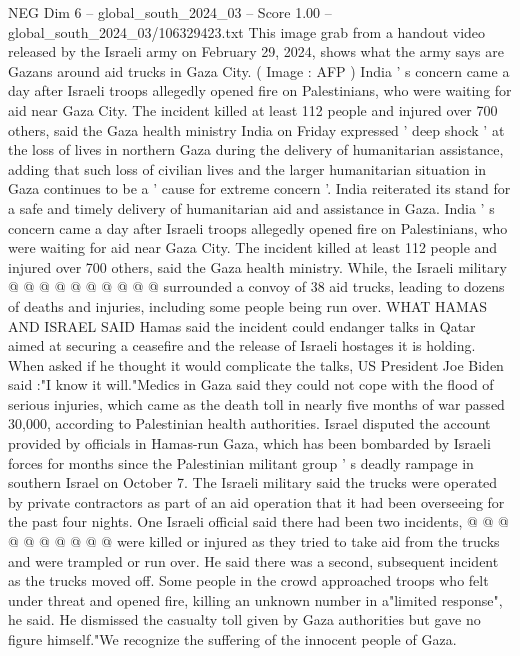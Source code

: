 \begin{textsample}{NEG Dim 6 – global\_south\_2024\_03 – Score 1.00 – global\_south\_2024\_03/106329423.txt}  \label{ex:f6_neg_392}
This image grab from a handout video released by the Israeli army on February 29, 2024, shows what the army says are Gazans around aid trucks in Gaza City. ( Image : AFP ) India ' s concern came a day after Israeli troops allegedly opened fire on Palestinians, who were waiting for aid near Gaza City.
The incident killed at least 112 people and injured over 700 others, said the Gaza health ministry India on Friday expressed ' deep shock ' at the loss of lives in northern Gaza during the delivery of humanitarian assistance, adding that such loss of civilian lives and the larger humanitarian situation in Gaza continues to be a ' cause for extreme concern '.
India reiterated its stand for a safe and timely delivery of humanitarian aid and assistance in Gaza.
India ' s concern came a day after Israeli troops allegedly opened fire on Palestinians, who were waiting for aid near Gaza City.
The incident killed at least 112 people and injured over 700 others, said the Gaza health ministry.
While, the Israeli military @ @ @ @ @ @ @ @ @ @ surrounded a convoy of 38 aid trucks, leading to dozens of deaths and injuries, including some people being run over.
WHAT HAMAS AND ISRAEL SAID Hamas said the incident could endanger talks in Qatar aimed at securing a ceasefire and the release of Israeli hostages it is holding.
When asked if he thought it would complicate the talks, US President Joe Biden said :"I know it will."Medics in Gaza said they could not cope with the flood of serious injuries, which came as the death toll in nearly five months of war passed 30,000, according to Palestinian health authorities.
Israel disputed the account provided by officials in Hamas-run Gaza, which has been bombarded by Israeli forces for months since the Palestinian militant group ' s deadly rampage in southern Israel on October 7.
The Israeli military said the trucks were operated by private contractors as part of an aid operation that it had been overseeing for the past four nights.
One Israeli official said there had been two incidents, @ @ @ @ @ @ @ @ @ @ were killed or injured as they tried to take aid from the trucks and were trampled or run over.
He said there was a second, subsequent incident as the trucks moved off.
Some people in the crowd approached troops who felt under threat and opened fire, killing an unknown number in a"limited response", he said.
He dismissed the casualty toll given by Gaza authorities but gave no figure himself."We recognize the suffering of the innocent people of Gaza.

\end{textsample}
